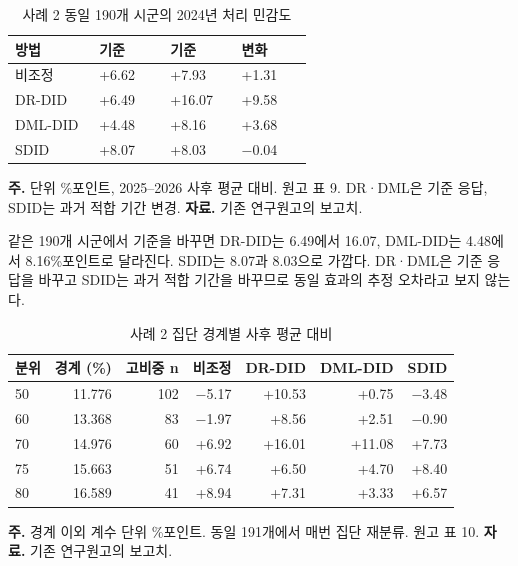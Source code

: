 \documentclass[11pt,a4paper]{article}
\begin{document}
\begin{table}[htbp]\centering\small
\caption{사례 2 동일 190개 시군의 2024년 처리 민감도}\label{tab:c2year}
\begin{tabular}{>{\raggedright\arraybackslash}p{0.26\linewidth} >{\raggedright\arraybackslash}p{0.22\linewidth} >{\raggedright\arraybackslash}p{0.22\linewidth} >{\raggedright\arraybackslash}p{0.22\linewidth}}
\toprule
방법 & 2023 기준 & 2024 기준 & 변화 \\
\midrule
비조정 & +6.62 & +7.93 & +1.31 \\
DR-DID & +6.49 & +16.07 & +9.58 \\
DML-DID & +4.48 & +8.16 & +3.68 \\
SDID & +8.07 & +8.03 & $-$0.04 \\
\bottomrule\end{tabular}
\par\vspace{3pt}\begin{minipage}{.98\linewidth}\footnotesize \raggedright\textbf{주.} 단위 \%포인트, 2025–2026 사후 평균 대비. 원고 표 9. DR·DML은 기준 응답, SDID는 과거 적합 기간 변경. \textbf{자료.} 기존 연구원고의 보고치.\end{minipage}
\end{table}
같은 190개 시군에서 기준을 바꾸면 DR-DID는 6.49에서 16.07, DML-DID는 4.48에서 8.16\%포인트로 달라진다. SDID는 8.07과 8.03으로 가깝다. DR·DML은 기준 응답을 바꾸고 SDID는 과거 적합 기간을 바꾸므로 동일 효과의 추정 오차라고 보지 않는다.
\begin{table}[htbp]\centering\small
\caption{사례 2 집단 경계별 사후 평균 대비}\label{tab:c2threshold}
\begin{tabular}{lrrrrrr}
\toprule
분위 & 경계 (\%) & 고비중 n & 비조정 & DR-DID & DML-DID & SDID \\
\midrule
50 & 11.776 & 102 & $-$5.17 & +10.53 & +0.75 & $-$3.48 \\
60 & 13.368 & 83 & $-$1.97 & +8.56 & +2.51 & $-$0.90 \\
70 & 14.976 & 60 & +6.92 & +16.01 & +11.08 & +7.73 \\
75 & 15.663 & 51 & +6.74 & +6.50 & +4.70 & +8.40 \\
80 & 16.589 & 41 & +8.94 & +7.31 & +3.33 & +6.57 \\
\bottomrule\end{tabular}
\par\vspace{3pt}\begin{minipage}{.98\linewidth}\footnotesize \raggedright\textbf{주.} 경계 이외 계수 단위 \%포인트. 동일 191개에서 매번 집단 재분류. 원고 표 10. \textbf{자료.} 기존 연구원고의 보고치.\end{minipage}
\end{table}
\end{document}
